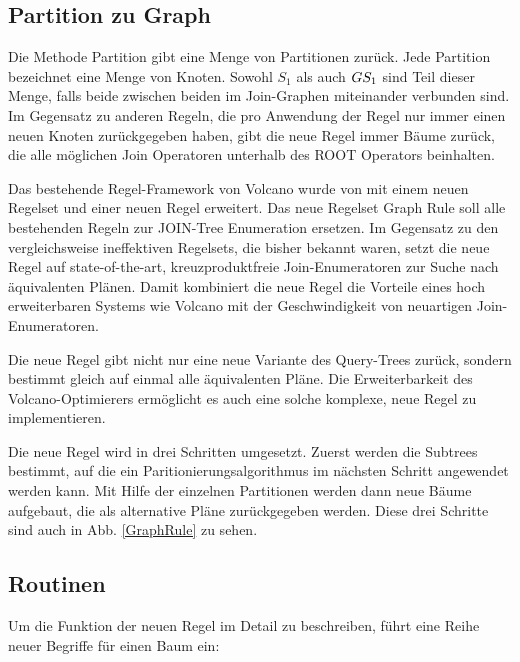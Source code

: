 \subsection{Partition zu Graph}



Die Methode Partition gibt eine Menge von Partitionen zurück. Jede Partition bezeichnet eine Menge von Knoten. Sowohl $S_1$ als auch $G\\S_1$ sind Teil dieser Menge, falls beide zwischen beiden im Join-Graphen miteinander verbunden sind. Im Gegensatz zu anderen Regeln, die pro Anwendung der Regel nur immer einen neuen Knoten zurückgegeben haben, gibt die neue Regel immer Bäume zurück, die alle möglichen Join Operatoren unterhalb des ROOT Operators beinhalten.





Das bestehende Regel-Framework von Volcano wurde von \cite{shanbhag2014optimizing} mit einem neuen Regelset und einer neuen Regel erweitert. Das neue Regelset Graph Rule soll alle bestehenden Regeln zur JOIN-Tree Enumeration ersetzen. Im Gegensatz zu den vergleichsweise ineffektiven Regelsets, die bisher bekannt waren, setzt die neue Regel auf state-of-the-art, kreuzproduktfreie Join-Enumeratoren zur Suche nach äquivalenten Plänen. Damit kombiniert die neue Regel die Vorteile eines hoch erweiterbaren Systems wie Volcano mit der Geschwindigkeit von neuartigen Join-Enumeratoren.

Die neue Regel gibt nicht nur eine neue Variante des Query-Trees zurück, sondern bestimmt gleich auf einmal alle äquivalenten Pläne. Die Erweiterbarkeit des Volcano-Optimierers ermöglicht es auch eine solche komplexe, neue Regel zu implementieren.

Die neue Regel wird in drei Schritten umgesetzt. Zuerst werden die Subtrees bestimmt, auf die ein Paritionierungsalgorithmus im nächsten Schritt angewendet werden kann. Mit Hilfe der einzelnen Partitionen werden dann neue Bäume aufgebaut, die als alternative Pläne zurückgegeben werden. Diese drei Schritte sind auch in Abb. \ref{GraphRule} zu sehen.

\subsection{Routinen}





Um die Funktion der neuen Regel im Detail zu beschreiben, führt \cite{shanbhag2014optimizing} eine Reihe neuer Begriffe für einen Baum ein:

